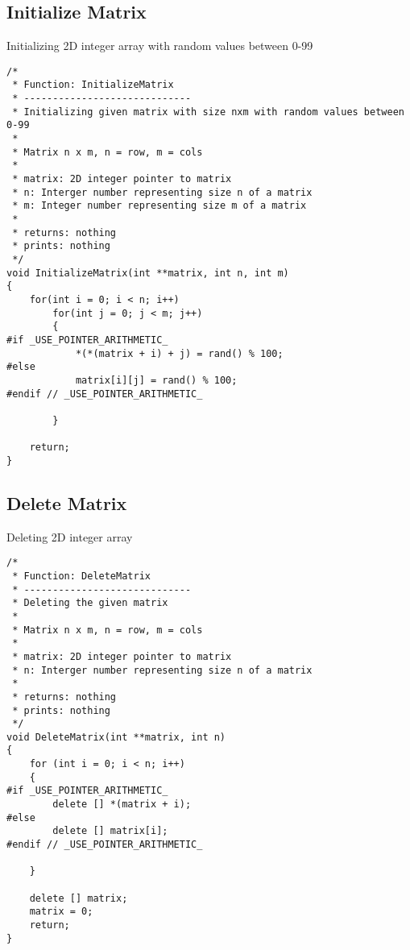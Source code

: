 \documentclass{article}
\begin{document}
	\subsection{Initialize Matrix}
		Initializing 2D integer array with random values between 0-99
		\begin{lstlisting}[label=lab3.8.2,caption=2D Matrix Initializing]
/*
 * Function: InitializeMatrix
 * -----------------------------
 * Initializing given matrix with size nxm with random values between 0-99
 *
 * Matrix n x m, n = row, m = cols
 *
 * matrix: 2D integer pointer to matrix
 * n: Interger number representing size n of a matrix
 * m: Integer number representing size m of a matrix
 *
 * returns: nothing
 * prints: nothing
 */
void InitializeMatrix(int **matrix, int n, int m)
{
    for(int i = 0; i < n; i++)
        for(int j = 0; j < m; j++)
        {
#if _USE_POINTER_ARITHMETIC_
            *(*(matrix + i) + j) = rand() % 100;
#else
            matrix[i][j] = rand() % 100;
#endif // _USE_POINTER_ARITHMETIC_

        }

    return;
}
		\end{lstlisting}	
		
	\subsection{Delete Matrix}
		Deleting 2D integer array
		\begin{lstlisting}[label=lab3.8.3,caption=2D Matrix Deletion]
/*
 * Function: DeleteMatrix
 * -----------------------------
 * Deleting the given matrix
 *
 * Matrix n x m, n = row, m = cols
 *
 * matrix: 2D integer pointer to matrix
 * n: Interger number representing size n of a matrix
 *
 * returns: nothing
 * prints: nothing
 */
void DeleteMatrix(int **matrix, int n)
{
    for (int i = 0; i < n; i++)
    {
#if _USE_POINTER_ARITHMETIC_
        delete [] *(matrix + i);
#else
        delete [] matrix[i];
#endif // _USE_POINTER_ARITHMETIC_

    }

    delete [] matrix;
    matrix = 0;
    return;
}
		\end{lstlisting}	
\end{document}
